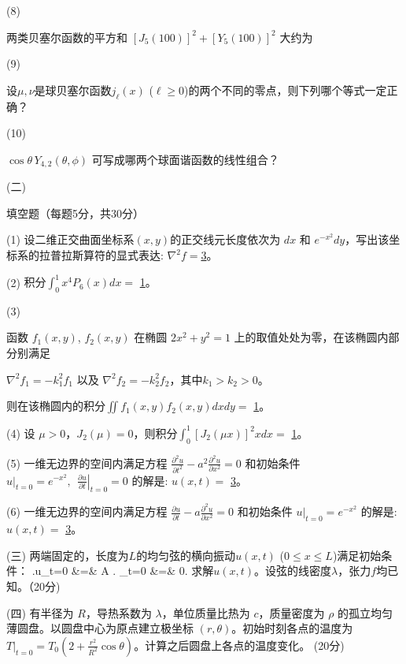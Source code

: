\documentclass[12pt,CJK]{article}
\begin{document}
{\item[(8)]{两类贝塞尔函数的平方和 $[J_{5}(100)]^2+[Y_{5}(100)]^2$ 大约为 \bropt

  }  

\item[(9)]{设$\mu, \nu$是球贝塞尔函数$j_\ell(x)$ ($\ell\ge 0$)的两个不同的零点，则下列哪个等式一定正确？ \bropt
  
  }
  
\item[(10)]{$\cos\theta\, Y_{4,2}(\theta,\phi)$ 可写成哪两个球面谐函数的线性组合？ \bropt
  
  }  

\eitem  
}
\item[(二)]{填空题（每题5分，共30分）
  \bitem
\item[(1)]{设二维正交曲面坐标系$(x,y)$的正交线元长度依次为 $dx$ 和 $e^{-x^2}dy$，写出该坐标系的拉普拉斯算符的显式表达: $\nabla^2 f= $\uline{3}。}
\item[(2)]{积分$\int_0^1 x^4 P_6(x) dx = $ \uline{1}。}
\item[(3)]{函数 $f_1(x,y)$, $f_2(x,y)$ 在椭圆 $2x^2+ y^2 = 1$ 上的取值处处为零，在该椭圆内部分别满足

  $ \nabla^2 f_1 =-k_1^2f_1$ 以及 $\nabla^2 f_2 = -k_2^2f_2$，其中$k_1>k_2>0$。

  则在该椭圆内的积分$\iint f_1(x,y)f_2(x,y) dx dy = $ \uline{1}。}
\item[(4)]{设 $\mu>0$，$J_2(\mu)=0$，则积分$\int_0^1\left[J_2(\mu x)\right]^2 x dx =$ \uline{1}。}  
\item[(5)]{一维无边界的空间内满足方程 $\frac{\partial^2u}{\partial t^2}-a^2\frac{\partial^2u}{\partial x^2} = 0$ 和初始条件  $\left.u\right\vert_{t=0} = e^{-x^2},\ \ \left.\frac{\partial u}{\partial t}\right\vert_{t=0} = 0$ 的解是: $u(x,t)=$ \uline{3}。 }
\item[(6)]{一维无边界的空间内满足方程 $\frac{\partial u}{\partial t}-a\frac{\partial^2u}{\partial x^2} = 0$ 和初始条件  $\left.u\right\vert_{t=0} = e^{-x^2}$ 的解是: $u(x,t)=$ \uline{3}。 }

  \eitem
}
\item[(三)]{两端固定的，长度为$L$的均匀弦的横向振动$u(x,t)$ ($0\le x\le L$)满足初始条件：
  \bea
  \left.u\right\vert_{t=0} &=& A\sin {} \newl
  \left. \right\vert_{t=0} &=& 0.
  \eea
  求解$u(x,t)$。设弦的线密度$\lambda$，张力$f$均已知。（20分)
}

\item[(四)]{有半径为 $R$，导热系数为 $\lambda$，单位质量比热为 $c$，质量密度为 $\rho$ 的孤立均匀薄圆盘。以圆盘中心为原点建立极坐标 $(r,\theta)$。初始时刻各点的温度为 $\left.T\right\vert_{t=0}= T_0\left(2 + \frac{r^2}{R^2}\cos\theta\right)$。计算之后圆盘上各点的温度变化。
(20分)}

  
\eitem  





\ech
\end{document}
